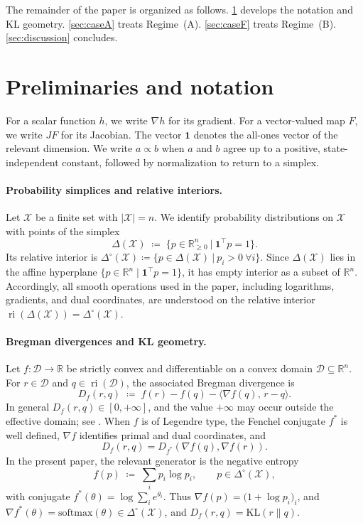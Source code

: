 \documentclass[12pt]{article}
\newcommand{\1}{\mathbb{1}}
\newcommand{\defeq}{\coloneq}
\DeclareMathOperator{\ri}{ri}
\newcommand{\menge}[2]{\big\{{#1}~\big |~{#2}\big\}}
\theoremstyle{definition}
\providecommand{\ri}{\operatorname{ri}}
\begin{document}
The remainder of the paper is organized as follows.
\cref{sec:prelim} develops the notation and KL geometry.
\cref{sec:caseA} treats Regime~(A).
\cref{sec:caseF} treats Regime~(B). \cref{sec:discussion} concludes.


\section{Preliminaries and notation}
\label{sec:prelim}

For a scalar function $h$, we write $\nabla h$ for its gradient.
For a vector-valued map $F$, we write $JF$ for its Jacobian.
The vector $\mathbf 1$ denotes the all-ones vector of the relevant dimension.
We write $a\propto b$ when $a$ and $b$ agree up to a positive,
state-independent constant, followed by normalization to return to a simplex.

\paragraph{Probability simplices and relative interiors.}
Let $\mathcal{X}$ be a finite set with $|\mathcal{X}|=n$.
We identify probability distributions on $\mathcal{X}$ with points of the simplex
\[
\Delta(\mathcal{X})
\;\defeq\;
\menge{p\in\mathbb{R}^n_{\ge 0}}{\mathbf{1}^\top p = 1}.
\]
Its relative interior is $\Delta^\circ(\mathcal{X})
\defeq
\menge{p\in\Delta(\mathcal{X})}{p_i>0\ \forall i}$. Since $\Delta(\mathcal{X})$ lies in the affine hyperplane
$\{p\in\mathbb{R}^n \mid \mathbf{1}^\top p = 1\}$, it has empty interior
as a subset of $\mathbb{R}^n$. Accordingly, all smooth operations used in the paper,
including logarithms, gradients, and dual coordinates, are understood on the
relative interior $\ri(\Delta(\mathcal{X}))=\Delta^\circ(\mathcal{X})$.

\paragraph{Bregman divergences and KL geometry.}
Let $f:\mathcal D\to\mathbb R$ be strictly convex and differentiable
on a convex domain $\mathcal D\subseteq\mathbb R^n$.
For $r\in\mathcal D$ and $q\in\ri(\mathcal D)$, the associated Bregman divergence is
\[
D_f(r,q)
\;\defeq\;
f(r)-f(q)-\langle \nabla f(q),\,r-q\rangle.
\]
In general $D_f(r,q)\in[0,+\infty]$, and the value $+\infty$
may occur outside the effective domain; see
\cite{bauschke1997legendre,bauschke2017convex}.
When $f$ is of Legendre type, the Fenchel conjugate $f^*$ is
well defined, $\nabla f$ identifies primal and dual coordinates, and
\[
D_f(r,q)=D_{f^*}(\nabla f(q),\nabla f(r)).
\]
In the present paper, the relevant generator is the negative entropy
\[
f(p)\;\defeq\;\sum_i p_i\log p_i,
\qquad
p\in\Delta^\circ(\mathcal{X}),
\]
with conjugate $f^*(\theta)=\log\sum_i e^{\theta_i}$. Thus $\nabla f(p)=\bigl(1+\log p_i\bigr)_i$, and $\nabla f^*(\theta)=\mathrm{softmax}(\theta)\in\Delta^\circ(\mathcal{X})$, and $D_f(r,q)=\mathrm{KL}(r\|q)$.
\end{document}
